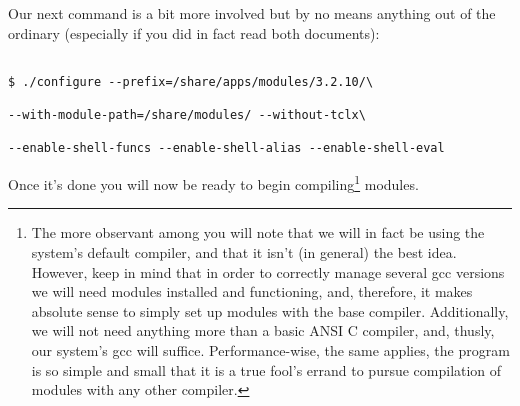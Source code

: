 \documentclass[]{article}
\begin{document}
                                                                                     Our next command is a bit more involved but by no means anything out of the ordinary (especially if you did 
                                                                                             in fact read both documents):
                                                                                         \begin{lstlisting}
                                                                                         $ ./configure --prefix=/share/apps/modules/3.2.10/\ 
                                                                                         --with-module-path=/share/modules/ --without-tclx\
                                                                                                            --enable-shell-funcs --enable-shell-alias --enable-shell-eval 
                                                                                                            \end{lstlisting}
                                                                                                            Once it's done you will now be ready to begin compiling\footnote{The more observant among you will note 
                                                                                                                that we will in fact be using the system's default compiler, and that it isn't (in general) the best idea.
                                                                                                                    However, keep in mind that in order to correctly manage several gcc versions we will need modules installed
                                                                                                                    and functioning, and, therefore, it makes absolute sense to simply set up modules with the base compiler. 
                                                                                                                    Additionally, we will not need anything more than a basic ANSI C compiler, and, thusly, our system's gcc
                                                                                                                    will suffice. Performance-wise, the same applies, the program is so simple and small that it is a true
                                                                                                                    fool's errand to pursue compilation of modules with any other compiler.} modules.
\end{document}

